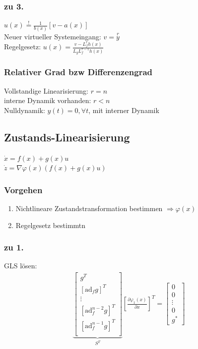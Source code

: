 \documentclass[german]{latex4ei/latex4ei_sheet}
\begin{document}
\subsubsection*{zu 3.}
$u(x) \overset{!}{=} \frac{1}{b(x)} [v - a(x)]$ \\
Neuer virtueller Systemeingang: $v = \overset{r}{y}$ \\
Regelgesetz: $u(x) = \frac{v - L_f^r h(x)}{L_g L_f^{r-1} h(x)}$

\subsubsection*{Relativer Grad bzw Differenzengrad}
Vollstandige Linearisierung: $r = n$ \\
interne Dynamik vorhanden: $r < n$ \\
Nulldynamik: $y(t) = 0, \forall t$, mit interner Dynamik


\subsection{Zustands-Linearisierung}
$\dot{x} = f(x) + g(x)u$ \\
$\dot{z} = \nabla \varphi(x) \left( f(x) + g(x)u \right)$

\subsubsection*{Vorgehen}
\begin{enumerate}
  \item Nichtlineare Zustandstransformation bestimmen $\Rightarrow \varphi(x)$
  \item Regelgesetz bestimmtn
\end{enumerate}

\subsubsection*{zu 1.}
GLS lösen: \\
\begin{align*}
  \underbrace{
  \begin{bmatrix}
    g^T \\
    [\text{ad}_f g]^T \\
    \vdots \\
    [\text{ad}^{n-2}_f g]^T \\
    [\text{ad}^{n-1}_f g]^T \\
  \end{bmatrix}
  }_{S^T}
  \left[ \frac{\partial \varphi_1(x)}{\partial x} \right]^T
  =
  \begin{bmatrix}
    0 \\
    0 \\
    \vdots \\
    0 \\
    g^*
  \end{bmatrix}
\end{align*}
\end{document}
